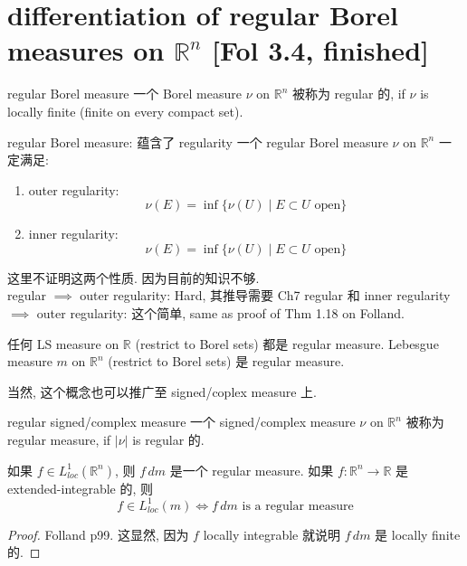 \documentclass[lang=cn,11pt]{elegantbook}
\begin{document}
\chapter{differentiation of regular Borel measures on $\mathbb{R}^n$ [Fol 3.4, finished]}

\begin{definition}{regular Borel measure}
    一个 Borel measure $\nu$ on $\mathbb{R}^n$ 被称为 regular 的, if $\nu$ is locally finite (finite on every compact set).
\end{definition}


\begin{theorem}{ regular Borel measure: 蕴含了 regularity}
一个 regular Borel measure $\nu$ on $\mathbb{R}^n$ 一定满足:
\begin{enumerate}
    \item outer regularity: $$\nu (E) = \inf \{ \nu(U) \mid  E \subset U  \text{ open}    \}$$
    \item inner regularity: $$\nu (E) = \inf \{ \nu(U) \mid  E \subset U  \text{ open}    \}$$
\end{enumerate}    
\end{theorem}
\begin{remark}
    这里不证明这两个性质. 因为目前的知识不够.\\
     regular $\implies$ outer regularity: Hard, 其推导需要 Ch7 
regular 和 inner regularity $\implies$ outer regularity: 这个简单, same as proof of Thm 1.18 on Folland.
\end{remark}


\begin{example}
 任何 LS measure on $\mathbb{R}$  (restrict to Borel sets) 都是 regular measure.
    Lebesgue measure $m$ on $\mathbb{R}^n$ (restrict to Borel sets)  是 regular measure.
\end{example}


当然, 这个概念也可以推广至 signed/coplex measure 上.
\begin{definition}{regular signed/complex measure}
    一个 signed/complex measure $\nu$ on $\mathbb{R}^n$ 被称为 regular measure, if $|\nu|$ is regular 的.
\end{definition}




\begin{lemma}
    如果 $f\in L^1_{loc} (\mathbb{R}^n)$, 则 $f\, dm$ 是一个 regular measure.
    如果 $f:\mathbb{R}^n \to \mathbb{R}$ 是 extended-integrable 的, 则 \[
    f \in L^1_{loc} (m) \iff f\, dm \text{ is a regular measure}
    \]
\end{lemma}
\begin{proof}
    Folland p99. 这显然, 因为 $f$ locally integrable 就说明 $f \, dm$ 是 locally finite 的.
\end{proof}
\end{document}
